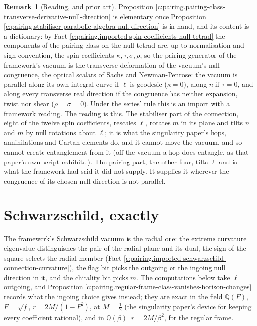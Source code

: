 \documentclass[11pt]{article}
\theoremstyle{definition}
\newtheorem{remark}[theorem]{Remark}
\theoremstyle{plain}
\providecommand{\Q}{}\renewcommand{\Q}{\mathbb{Q}}
\providecommand{\mb}{}\renewcommand{\mb}{\bar m}
\begin{document}
\begin{remark}[Reading, and prior art]\label{c:note.pairing.reading-prior-art}
Proposition \ref{c:pairing.pairing-class-transverse-derivative-null-direction} is elementary once Proposition \ref{c:pairing.stabiliser-parabolic-algebra-null-direction} is in hand, and its content is a dictionary: by Fact \ref{c:pairing.imported-spin-coefficients-null-tetrad} the components of the pairing class on the null tetrad are, up to normalisation and sign convention, the spin coefficients $\kappa, \tau, \sigma, \rho$, so the pairing generator of the framework's vacuum is the transverse deformation of the vacuum's null congruence, the optical scalars of Sachs and Newman-Penrose: the vacuum is parallel along its own integral curve if $\ell$ is geodesic ($\kappa = 0$), along $n$ if $\tau = 0$, and along every transverse real direction if the congruence has neither expansion, twist nor shear ($\rho = \sigma = 0$). Under the series' rule this is an import with a framework reading. The reading is this. The stabiliser part of the connection, eight of the twelve spin coefficients, rescales $\ell$, rotates $m$ in its plane and tilts $n$ and $\mb$ by null rotations about $\ell$; it is what the singularity paper's hops, annihilations and Cartan elements do, and it cannot move the vacuum, and so cannot create entanglement from it (off the vacuum a hop does entangle, as that paper's own script exhibits \cite[Rem.~13.5]{ButlerT5}). The pairing part, the other four, tilts $\ell$ and is what the framework had said it did not supply. It supplies it wherever the congruence of its chosen null direction is not parallel.
\end{remark}

\section{Schwarzschild, exactly}

\label{c:note.pairing.setting-schwarzschild-exactly}
The framework's Schwarzschild vacuum is the radial one: the extreme curvature eigenvalue distinguishes the pair of the radial plane and its dual, the sign of the square selects the radial member (Fact \ref{c:pairing.imported-schwarzschild-connection-curvature}), the flag bit picks the outgoing or the ingoing null direction in it, and the chirality bit picks $m$. The computations below take $\ell$ outgoing, and Proposition \ref{c:pairing.regular-frame-class-vanishes-horizon-changes} records what the ingoing choice gives instead; they are exact in the field $\Q(F)$, $F = \sqrt f$, $r = 2M/(1 - F^{2})$, at $M = \tfrac12$ (the singularity paper's device for keeping every coefficient rational), and in $\Q(\beta)$, $r = 2M/\beta^{2}$, for the regular frame.
\end{document}
